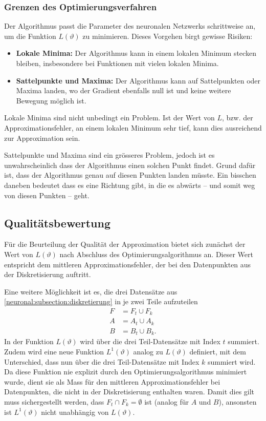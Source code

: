 \subsubsection{Grenzen des Optimierungsverfahren}\label{neuronal:subsubsection:optimierungsverfahren_grenzen}

Der Algorithmus passt die Parameter des neuronalen Netzwerks schrittweise an, um die Funktion \( L(\vartheta) \) zu minimieren. 
Dieses Vorgehen birgt gewisse Risiken:
\begin{itemize}
    \item \textbf{Lokale Minima:} Der Algorithmus kann in einem lokalen Minimum stecken bleiben, insbesondere bei Funktionen mit vielen lokalen Minima.
    \item \textbf{Sattelpunkte und Maxima:} Der Algorithmus kann auf Sattelpunkten oder Maxima landen, wo der Gradient ebenfalls null ist und keine weitere Bewegung möglich ist.
\end{itemize}

Lokale Minima sind nicht unbedingt ein Problem. 
Ist der Wert von $L$, bzw. der Approximationsfehler, an einem lokalen Minimum sehr tief, kann dies ausreichend zur Approximation sein.

Sattelpunkte und Maxima sind ein grösseres Problem, jedoch ist es unwahrscheinlich dass der Algorithmus einen solchen Punkt findet.
Grund dafür ist, dass der Algorithmus genau auf diesen Punkten landen müsste.
Ein bisschen daneben bedeutet dass es eine Richtung gibt, in die es abwärts -- und somit weg von diesen Punkten -- geht.

\subsection{Qualitätsbewertung}\label{neuronal:subsection:qualitätsbewertung}
Für die Beurteilung der Qualität der Approximation bietet sich zunächst der Wert von \( L(\vartheta) \) nach Abschluss des Optimierungsalgorithmus an.
Dieser Wert entspricht dem mittleren Approximationsfehler, der bei den Datenpunkten aus der Diskretisierung auftritt.

Eine weitere Möglichkeit ist es, die drei Datensätze aus \ref{neuronal:subsection:diskretierung} in je zwei Teile aufzuteilen
\begin{equation*}
    \begin{aligned}
        F &= F_t \cup F_k\\
        A &= A_t \cup A_k\\
        B &= B_t \cup B_k.
    \end{aligned}
\end{equation*}
In der Funktion $L(\vartheta)$ wird über die drei Teil-Datensätze mit Index $t$ summiert.
Zudem wird eine neue Funktion \( L^1(\vartheta) \) analog zu $L(\vartheta)$ definiert, mit dem Unterschied, dass nun über die drei Teil-Datensätze mit Index $k$ summiert wird.
Da diese Funktion nie explizit durch den Optimierungsalgorithmus minimiert wurde, dient sie als Mass für den mittleren Approximationsfehler bei Datenpunkten, die nicht in der Diskretisierung enthalten waren.
Damit dies gilt muss sichergestellt werden, dass $F_t \cap F_k = \emptyset$ ist (analog für $A$ und $B$), ansonsten ist $L^1(\vartheta)$ nicht unabhängig von $L(\vartheta)$.

